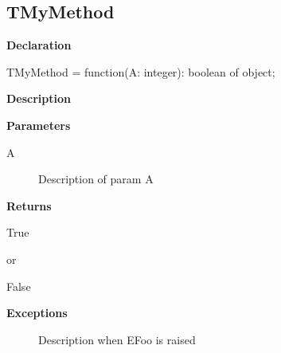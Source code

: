 \documentclass{report}
\begin{document}
\subsection*{TMyMethod}
\begin{list}{}{
\setlength{\itemindent}{0cm}
\setlength{\listparindent}{0cm}
\setlength{\leftmargin}{\evensidemargin}
\addtolength{\leftmargin}{\tmplength}
\settowidth{\labelsep}{X}
\addtolength{\leftmargin}{\labelsep}
\setlength{\labelwidth}{\tmplength}
}
\begin{flushleft}
\item[\textbf{Declaration}\hfill]
\begin{ttfamily}
TMyMethod = function(A: integer): boolean of object;\end{ttfamily}


\end{flushleft}
\par
\item[\textbf{Description}]
  \par
\item[\textbf{Parameters}]
\begin{description}
\item[A] Description of param A
\end{description}
\item[\textbf{Returns}]\begin{ttfamily}True\end{ttfamily} or \begin{ttfamily}False\end{ttfamily}
\item[\textbf{Exceptions}]
\begin{description}
\item[\begin{ttfamily}EFoo\end{ttfamily}(\ref{ok_param_raises_returns_proctype.EFoo})] Description when EFoo is raised
\end{description}


\end{list}
\end{document}
